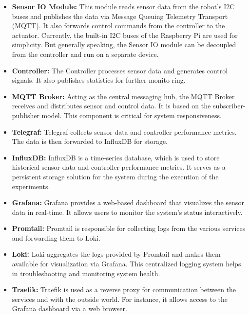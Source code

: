 \begin{itemize}
    \item \textbf{Sensor IO Module:}
    This module reads sensor data from the robot's I2C buses and publishes the data via Message Queuing Telemetry Transport (MQTT).
    It also forwards control commands from the controller to the actuator.
    Currently, the built-in I2C buses of the Raspberry Pi are used for simplicity.
    But generally speaking, the Sensor IO module can be decoupled from the controller and run on a separate device.

    \item \textbf{Controller:}
    The Controller processes sensor data and generates control signals.
    It also publishes statistics for further monito ring.

    \item \textbf{MQTT Broker:}
    Acting as the central messaging hub, the MQTT Broker receives and distributes sensor and control data.
    It is based on the subscriber-publisher model.
    This component is critical for system responsiveness.

    \item \textbf{Telegraf:}
    Telegraf collects sensor data and controller performance metrics.
    The data is then forwarded to InfluxDB for storage.

    \item \textbf{InfluxDB:}
    InfluxDB is a time-series database, which is used to store historical sensor data and controller performance metrics.
    It serves as a persistent storage solution for the system during the execution of the experiments.

    \item \textbf{Grafana:}
    Grafana provides a web-based dashboard that visualizes the sensor data in real-time.
    It allows users to monitor the system's status interactively.

    \item \textbf{Promtail:}
    Promtail is responsible for collecting logs from the various services and forwarding them to Loki.

    \item \textbf{Loki:}
    Loki aggregates the logs provided by Promtail and makes them available for visualization via Grafana.
    This centralized logging system helps in troubleshooting and monitoring system health.

    \item \textbf{Traefik:}
    Traefik is used as a reverse proxy for communication between the services and with the outside world.
    For instance, it allows access to the Grafana dashboard via a web browser.
\end{itemize}


